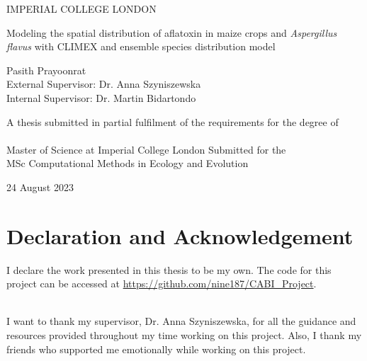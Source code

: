 \documentclass[a4paper,11]{article}
\begin{document}
	\begin{center}
		{\large IMPERIAL COLLEGE LONDON}
	\end{center}
	\vspace{4cm}
	
	\begin{center}
		
		\Huge Modeling the spatial distribution of aflatoxin in maize crops and \textit{Aspergillus flavus} with CLIMEX and ensemble species distribution model\\	
  
		\vspace{.5cm}		

  
	\end{center}
	\vspace{2.5cm}
	\begin{center}
		\Large Pasith Prayoonrat\\External Supervisor: Dr. Anna Szyniszewska
        \\Internal Supervisor: Dr. Martin Bidartondo
	\end{center}
	
	\vspace{4cm}
	\begin{center}
		{\large A thesis submitted in partial fulfilment of the requirements for the degree of \\
        \\ Master of Science at Imperial College London Submitted for the \\ MSc Computational Methods in Ecology and Evolution}
	\end{center}
	
	\begin{center}
		{\large 24 August 2023}
	\end{center}		

\newpage

\section*{Declaration and Acknowledgement}
I declare the work presented in this thesis to be my own.
The code for this project can be accessed at \url{https://github.com/nine187/CABI_Project}.

\\
I want to thank my supervisor, Dr. Anna Szyniszewska, for all the guidance and resources provided throughout my time working on this project.  Also, I thank my friends who supported me emotionally while working on this project.
\end{document}
